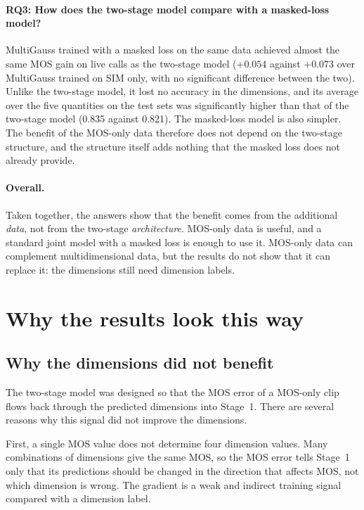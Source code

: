 \documentclass[
english,                 %
bibtex,                  %
includeExtraAbstracts, %
]{kththesis}
\numberwithin{listing}{chapter}
\begin{document}
\paragraph{RQ3: How does the two-stage model compare with a masked-loss model?}
MultiGauss trained with a masked loss on the same data achieved almost the same MOS gain on live calls as the two-stage model ($+0.054$ against $+0.073$ over MultiGauss trained on SIM only, with no significant difference between the two). Unlike the two-stage model, it lost no accuracy in the dimensions, and its average over the five quantities on the test sets was significantly higher than that of the two-stage model (0.835 against 0.821). The masked-loss model is also simpler. The benefit of the MOS-only data therefore does not depend on the two-stage structure, and the structure itself adds nothing that the masked loss does not already provide.

\paragraph{Overall.} Taken together, the answers show that the benefit comes from the additional \emph{data}, not from the two-stage \emph{architecture}. MOS-only data is useful, and a standard joint model with a masked loss is enough to use it. MOS-only data can complement multidimensional data, but the results do not show that it can replace it: the dimensions still need dimension labels.

\section{Why the results look this way}
\label{sec:whyResults}

\subsection{Why the dimensions did not benefit}

The two-stage model was designed so that the MOS error of a MOS-only clip flows back through the predicted dimensions into Stage~1. There are several reasons why this signal did not improve the dimensions.

First, a single MOS value does not determine four dimension values. Many combinations of dimensions give the same MOS, so the MOS error tells Stage~1 only that its predictions should be changed in the direction that affects MOS, not which dimension is wrong. The gradient is a weak and indirect training signal compared with a dimension label.
\end{document}
